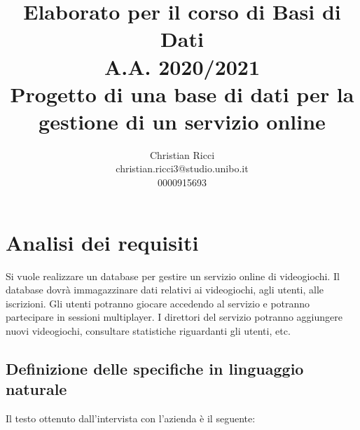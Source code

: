 \documentclass[a4paper,12pt]{report}
\title{
\Huge Elaborato per il corso di Basi di Dati \\
[4mm]
\large A.A. 2020/2021 \\
\large Progetto di una base di dati per la gestione di un servizio online
}
\author{Christian Ricci \\
christian.ricci3@studio.unibo.it \\
0000915693}
\begin{document}

\maketitle
\tableofcontents

\chapter{Analisi dei requisiti}

Si vuole realizzare un database per gestire un servizio online di videogiochi. Il database dovrà immagazzinare dati relativi ai videogiochi, agli utenti, alle iscrizioni. Gli utenti potranno {giocare} accedendo al servizio e potranno partecipare in sessioni multiplayer. I direttori del servizio potranno aggiungere nuovi videogiochi, consultare statistiche riguardanti gli utenti, etc.

\section{Definizione delle specifiche in linguaggio naturale}

Il testo ottenuto dall'intervista con l'azienda è il seguente:\\\\
\end{document}
